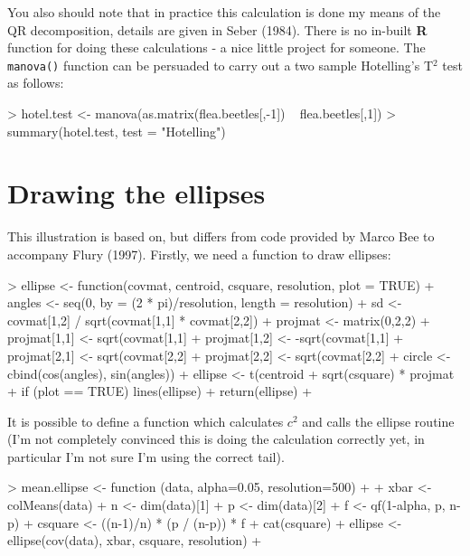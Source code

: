 \documentclass[11pt]{article}
\begin{document}
You also should note that in practice this calculation is done my means of the QR decomposition, details are given in Seber (1984).   There is no in-built \textbf{R} function for doing these calculations - a nice little project for someone.   The \texttt{manova()} function can be persuaded to carry out a two sample Hotelling's T$^{2}$ test as follows:

\begin{Schunk}
\begin{Sinput}
> hotel.test <- manova(as.matrix(flea.beetles[,-1]) ~ flea.beetles[,1])
> summary(hotel.test, test = "Hotelling")
\end{Sinput}
\end{Schunk}

\section{Drawing the ellipses}


This illustration is based on, but differs from code provided by Marco Bee to accompany Flury (1997).   Firstly, we need a function to draw ellipses:

\begin{Schunk}
\begin{Sinput}
> ellipse <- function(covmat, centroid, csquare, resolution, plot = TRUE) {
+ angles <- seq(0, by = (2 * pi)/resolution, length = resolution)
+   sd <- covmat[1,2] / sqrt(covmat[1,1] * covmat[2,2])
+     projmat <- matrix(0,2,2)
+     projmat[1,1] <- sqrt(covmat[1,1] %
+     projmat[1,2] <- -sqrt(covmat[1,1] %
+     projmat[2,1] <- sqrt(covmat[2,2] %
+     projmat[2,2] <- sqrt(covmat[2,2] %
+ circle <- cbind(cos(angles), sin(angles))
+ ellipse <- t(centroid + sqrt(csquare) * projmat %
+ if (plot == TRUE) {lines(ellipse)}
+ return(ellipse)
+ }
\end{Sinput}
\end{Schunk}

It is possible to define a function which calculates $c^{2}$ and calls the ellipse routine (I'm not completely convinced this is doing the calculation correctly yet, in particular I'm not sure I'm using the correct tail).

\begin{Schunk}
\begin{Sinput}
> mean.ellipse <- function (data, alpha=0.05, resolution=500) 
+ {
+ xbar <- colMeans(data)
+ n <- dim(data)[1]
+ p <- dim(data)[2]
+ f <- qf(1-alpha, p, n-p)
+ csquare <- ((n-1)/n) * (p / (n-p)) * f
+ cat(csquare) 
+ ellipse <- ellipse(cov(data), xbar, csquare, resolution)
+ }
\end{Sinput}
\end{Schunk}
\end{document}
